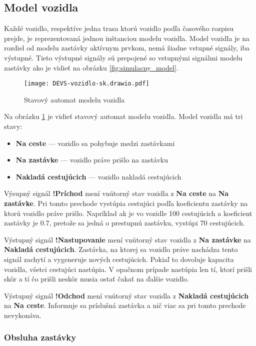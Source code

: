 \subsection*{Model vozidla}
\label{model_vozidla}

Každé vozidlo, respektíve jedna trasa ktorú vozidlo podľa časového rozpisu prejde, je reprezentovaná jednou inštanciou modelu vozidla.
Model vozidla je na rozdiel od modelu zastávky aktívnym prvkom, nemá žiadne vstupné signály, iba výstupné.
Tieto výstupné signály sú prepojené so vstupnými signálmi modelu zastávky ako je vidieť na obrázku \ref{fig:simulacny_model}.

\begin{figure}[h]
  \label{fig:model_vozidla}
  \centering
  \texttt{[image: DEVS-vozidlo-sk.drawio.pdf]}
  \caption{Stavový automat modelu vozidla}
\end{figure}

Na obrázku \ref{fig:model_vozidla} je vidieť stavový automat modelu vozidla.
Model vozidla má tri stavy:
\begin{itemize}
  \item \textbf{Na ceste} --- vozidlo sa pohybuje medzi zastávkami
  \item \textbf{Na zastávke} --- vozidlo práve prišlo na zastávku
  \item \textbf{Nakladá cestujúcich} --- vozidlo nakladá cestujúcich
\end{itemize}

Výsupný signál \textbf{!Príchod} mení vnútorný stav vozidla z \textbf{Na ceste} na \textbf{Na zastávke}.
Pri tomto prechode vystúpia cestujúci podľa koeficientu zastávky na ktorú vozidlo práve prišlo.
Napríklad ak je vo vozidle 100 cestujúcich a koeficient zastávky je 0.7, pretože sa jedná o prestupnú zastávku, vystúpi 70 cestujúcich.

Výstupný signál \textbf{!Nastupovanie} mení vnútorný stav vozidla z \textbf{Na zastávke} na \textbf{Nakladá cestujúcich}.
Zastávka, na ktorej sa vozidlo práve nachádza tento signál zachytí a vygeneruje nových cestujúcich.
Pokiaľ to dovoluje kapacita vozidla, všetci cestujúci nastúpia.
V opačnom prípade nastúpia len tí, ktorí prišli skôr a tí čo prišli neskôr musia ostať čakať na ďalšie vozidlo.

Výstupný signál \textbf{!Odchod} mení vnútorný stav vozidla z \textbf{Nakladá cestujúcich} na \textbf{Na ceste}.
Informuje sa príslušná zastávka a nič viac sa pri tomto prechode nevykonáva.

\subsubsection{Obsluha zastávky}


